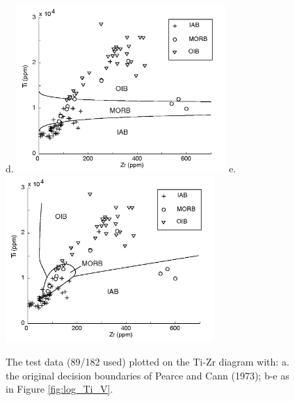 \begin{figure}[htbp]
d.  \includegraphics[width=300]{figures/test_Ti_Zr_lin.jpg}
e.  \includegraphics[width=300]{figures/test_Ti_Zr_q.jpg}
  \caption[The test data plotted on the Ti-Zr diagram]
{The test data (89/182 used) plotted on the Ti-Zr diagram with: a. the
original  decision boundaries  of Pearce  and Cann  (1973); b-e  as in
Figure \ref{fig:log_Ti_V}.}
  \label{fig:log_Ti_Zr}
\end{figure}


